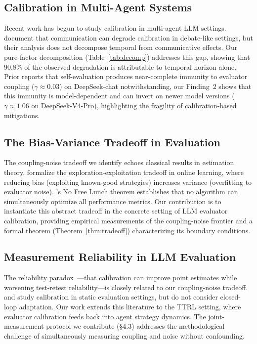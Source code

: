 \documentclass[11pt]{article}
\theoremstyle{definition}
\theoremstyle{remark}
\begin{document}



\subsection{Calibration in Multi-Agent Systems}

Recent work has begun to study calibration in multi-agent LLM settings. \citet{huang2026cagecal} document that communication can degrade calibration in debate-like settings, but their analysis does not decompose temporal from communicative effects. Our pure-factor decomposition (Table~\ref{tab:decomp}) addresses this gap, showing that 90.8\% of the observed degradation is attributable to temporal horizon alone. Prior reports that self-evaluation produces near-complete immunity to evaluator coupling ($\gamma{\approx}0.03$) on DeepSeek-chat notwithstanding, our Finding~2 shows that this immunity is model-dependent and can invert on newer model versions ($\gamma{\approx}1.06$ on DeepSeek-V4-Pro), highlighting the fragility of calibration-based mitigations.

\subsection{The Bias-Variance Tradeoff in Evaluation}

The coupling-noise tradeoff we identify echoes classical results in estimation theory. \citet{bubeck2012regret} formalize the exploration-exploitation tradeoff in online learning, where reducing bias (exploiting known-good strategies) increases variance (overfitting to evaluator noise). \citet{wolpert1997no}'s No Free Lunch theorem establishes that no algorithm can simultaneously optimize all performance metrics. Our contribution is to instantiate this abstract tradeoff in the concrete setting of LLM evaluator calibration, providing empirical measurements of the coupling-noise frontier and a formal theorem (Theorem~\ref{thm:tradeoff}) characterizing its boundary conditions.

\subsection{Measurement Reliability in LLM Evaluation}

The reliability paradox~\citep{messing2026tee}---that calibration can improve point estimates while worsening test-retest reliability---is closely related to our coupling-noise tradeoff. \citet{guo2017calibration} and \citet{tian2023calibration} study calibration in static evaluation settings, but do not consider closed-loop adaptation. Our work extends this literature to the TTRL setting, where evaluator calibration feeds back into agent strategy dynamics. The joint-measurement protocol we contribute (\S4.3) addresses the methodological challenge of simultaneously measuring coupling and noise without confounding.
\end{document}
